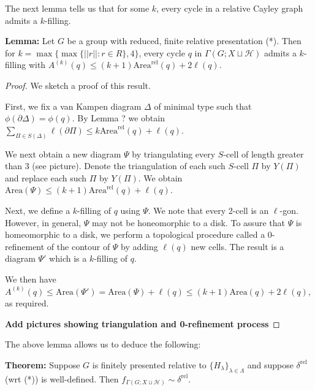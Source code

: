 \documentclass[12pt]{article}
\newcommand{\vs}{\vskip10pt}
\begin{document}
	The next lemma tells us that for some $k$, every cycle in a relative Cayley graph admits a $k$-filling. 
	
	\vs 
	
	\textbf{Lemma: } Let $G$ be a group with reduced, finite relative presentation (*). Then for $k = \max \{\max \{\vert \vert r \vert \vert : r \in R\}, 4\}$, every cycle $q$ in $\Gamma(G; X \sqcup \mathcal{H})$ admits a $k$-filling with $A^{(k)}(q) \leq (k+1) \text{Area}^{\text{rel}}(q) + 2 \ell (q)$. 
	
	\begin{proof}
		
		We sketch a proof of this result. 
		
		\vs 
		
		First, we fix a van Kampen diagram $\Delta$ of minimal type such that $\phi(\partial \Delta) = \phi(q)$. By Lemma ? we obtain $\sum_{\Pi \in S(\Delta)} \ell(\partial \Pi) \leq k \text{Area}^{\text{rel}}(q) + \ell(q)$. 
		
		\vs 
		
		We next obtain a new diagram $\Psi$ by triangulating every $S$-cell of length greater than 3 (see picture). Denote the triangulation of each such $S$-cell $\Pi$ by $Y(\Pi)$ and replace each such $\Pi$ by $Y(\Pi)$. We obtain $\text{Area} (\Psi) \leq (k+1) \text{Area}^{\text{rel}}(q) + \ell(q)$. 
		
		\vs 
		
		Next, we define a $k$-filling of $q$ using $\Psi$. We note that every 2-cell is an $\ell$-gon. However, in general, $\Psi$ may not be honeomorphic to a disk. To assure that $\Psi$ is homeomorphic to a disk, we perform a topological procedure called a 0-refinement of the contour of $\Psi$ by adding $\ell(q)$ new cells. The result is a diagram $\Psi'$ which is a $k$-filling of $q$. 
		
		\vs 
		
		We then have $A^{(k)}(q) \leq \text{Area}(\Psi') = \text{Area}(\Psi) + \ell(q) \leq (k+1) \text{Area}(q) + 2 \ell(q)$, as required. 
		
		\vs
		
		\textbf{Add pictures showing triangulation and 0-refinement process}
		
	\end{proof}

	The above lemma allows us to deduce the following: 
	
	\vs
	
	\textbf{Theorem: } Suppose $G$ is finitely presented relative to $\{H_{\lambda}\}_{\lambda \in \Lambda}$ and suppose $\delta^{\text{rel}}$ (wrt (*)) is well-defined. Then $f_{\Gamma(G; X \sqcup \mathcal{H})} \sim \delta^{\text{rel}}$. 
	
\end{document}
